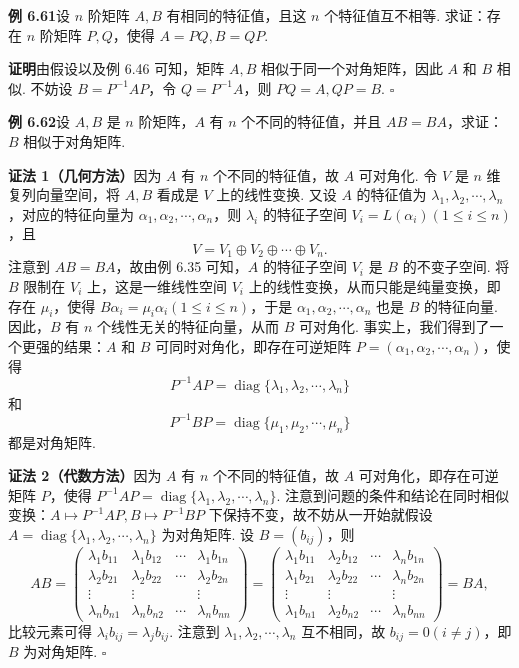 \documentclass[UTF8, 12pt, fontset=fandol, oneside]{ctexart}
\begin{document}
\noindent\textbf{例 6.61}\quad 设 $n$ 阶矩阵 $A,B$ 有相同的特征值，且这 $n$ 个特征值互不相等. 求证：存在 $n$ 阶矩阵 $P,Q$，使得 $A=PQ,B=QP$.

\noindent\textbf{证明}\quad 由假设以及例 6.46 可知，矩阵 $A,B$ 相似于同一个对角矩阵，因此 $A$ 和 $B$ 相似. 不妨设 $B=P^{-1}AP$，令 $Q=P^{-1}A$，则 $PQ=A,QP=B$. $\square$

\noindent\textbf{例 6.62}\quad 设 $A,B$ 是 $n$ 阶矩阵，$A$ 有 $n$ 个不同的特征值，并且 $AB=BA$，求证：$B$ 相似于对角矩阵.

\noindent\textbf{证法 1（几何方法）}\quad 因为 $A$ 有 $n$ 个不同的特征值，故 $A$ 可对角化. 令 $V$ 是 $n$ 维复列向量空间，将 $A,B$ 看成是 $V$ 上的线性变换. 又设 $A$ 的特征值为 $\lambda_1,\lambda_2,\cdots,\lambda_n$，对应的特征向量为 $\alpha_1,\alpha_2,\cdots,\alpha_n$，则 $\lambda_i$ 的特征子空间 $V_i=L(\alpha_i)(1\le i\le n)$，且
\[
V=V_1\oplus V_2\oplus\cdots\oplus V_n.
\]
注意到 $AB=BA$，故由例 6.35 可知，$A$ 的特征子空间 $V_i$ 是 $B$ 的不变子空间. 将 $B$ 限制在 $V_i$ 上，这是一维线性空间 $V_i$ 上的线性变换，从而只能是纯量变换，即存在 $\mu_i$，使得 $B\alpha_i=\mu_i\alpha_i(1\le i\le n)$，于是 $\alpha_1,\alpha_2,\cdots,\alpha_n$ 也是 $B$ 的特征向量. 因此，$B$ 有 $n$ 个线性无关的特征向量，从而 $B$ 可对角化. 事实上，我们得到了一个更强的结果：$A$ 和 $B$ 可同时对角化，即存在可逆矩阵 $P=(\alpha_1,\alpha_2,\cdots,\alpha_n)$，使得
\[
P^{-1}AP=\operatorname{diag}\{\lambda_1,\lambda_2,\cdots,\lambda_n\}
\]
和
\[
P^{-1}BP=\operatorname{diag}\{\mu_1,\mu_2,\cdots,\mu_n\}
\]
都是对角矩阵.

\noindent\textbf{证法 2（代数方法）}\quad 因为 $A$ 有 $n$ 个不同的特征值，故 $A$ 可对角化，即存在可逆矩阵 $P$，使得 $P^{-1}AP=\operatorname{diag}\{\lambda_1,\lambda_2,\cdots,\lambda_n\}$. 注意到问题的条件和结论在同时相似变换：$A\mapsto P^{-1}AP,B\mapsto P^{-1}BP$ 下保持不变，故不妨从一开始就假设 $A=\operatorname{diag}\{\lambda_1,\lambda_2,\cdots,\lambda_n\}$ 为对角矩阵. 设 $B=(b_{ij})$，则
\[
AB=\left(\begin{array}{cccc}
\lambda_1b_{11} & \lambda_1b_{12} & \cdots & \lambda_1b_{1n}\\
\lambda_2b_{21} & \lambda_2b_{22} & \cdots & \lambda_2b_{2n}\\
\vdots & \vdots & & \vdots\\
\lambda_nb_{n1} & \lambda_nb_{n2} & \cdots & \lambda_nb_{nn}
\end{array}\right)
=\left(\begin{array}{cccc}
\lambda_1b_{11} & \lambda_2b_{12} & \cdots & \lambda_nb_{1n}\\
\lambda_1b_{21} & \lambda_2b_{22} & \cdots & \lambda_nb_{2n}\\
\vdots & \vdots & & \vdots\\
\lambda_1b_{n1} & \lambda_2b_{n2} & \cdots & \lambda_nb_{nn}
\end{array}\right)=BA,
\]
比较元素可得 $\lambda_i b_{ij}=\lambda_j b_{ij}$. 注意到 $\lambda_1,\lambda_2,\cdots,\lambda_n$ 互不相同，故 $b_{ij}=0(i\ne j)$，即 $B$ 为对角矩阵. $\square$
\end{document}
